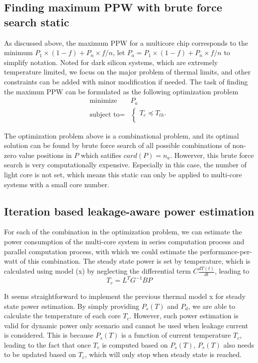 \subsection{Finding maximum PPW with brute force search static}
As discussed above, the maximum PPW for a multicore chip corresponds to the minimum $P_{1} \times (1-f)+P_{n} \times f/n$, let $P_{a} = P_{1} \times (1-f)+P_{n} \times f/n$ to simplify notation. Noted for dark silicon systems, which are extremely temperature limited, we focus on the major problem of thermal limits, and other constraints can be added with minor modification if needed. The task of finding the maximun PPW can be formulated as the following optimization problem
\begin{equation}
\begin{split}
\text{minimize } & P_{a}\\
\text{subject to} = &\left\{
\begin{array}{c}
T_{c} \preceq T_{th}.\\
\end{array}
\right.
\end{split}
\end{equation}

The optimization problem above is a combinational problem, and its optimal solution can be found by brute force search of all possible combinations of non-zero value positions in $P$ which satifies $card(P) = n_{a}$. Howerver, this brute force search is very computationally expensive. Especially in this case, the number of light core is not set, which means this static can only be applied to multi-core systems with a small core number.

\subsection{Iteration based leakage-aware power estimation}
For each of the combination in the optimization problem, we can estimate the power consumption of the multi-core system in series computation process and parallel computation process, with which we could estimate the performance-per-watt of this combination. The steady state power is set by temperature, which is calculated using model (x) by neglecting the differential term $C\frac{dT(t)}{dt}$, leading to
\begin{equation}\label{steady_state_temperature}
T_{c} = L^{T}G^{-1}BP
\end{equation}

It seems straightforward to implement the previous thermal model x for steady state power estimation. By simply providing $P_s(T)$ and $P_d$, we are able to calculate the temperature of each core $T_{c}$. However, such power estimation is valid for dynamic power only scenario and cannot be used when leakage current is considered. This is because $P_{s}(T)$ is a function of current temperature $T_{c}$, leading to the fact that once $T_{c}$ is computed based on $P_{s}(T)$, $P_{s}(T)$ also needs to be updated based on $T_{c}$, which will only stop when steady state is reached.

